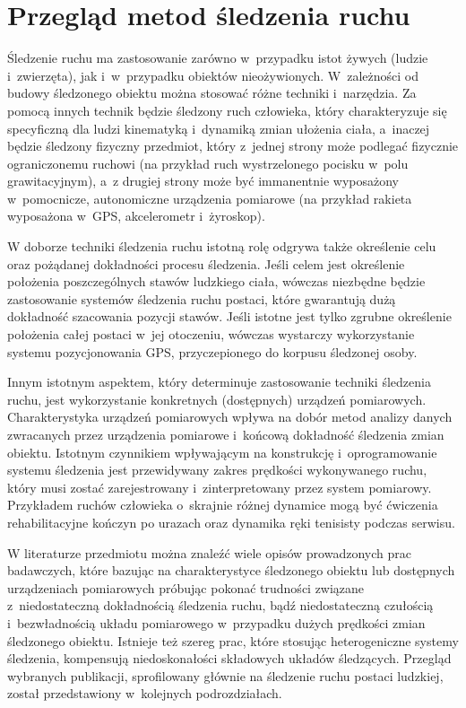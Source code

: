 \chapter{Przegląd metod śledzenia ruchu}\label{chap:literature}

Śledzenie ruchu ma zastosowanie zarówno w~przypadku istot żywych (ludzie i~zwierzęta), jak i~w~przypadku obiektów nieożywionych. W~zależności od budowy śledzonego obiektu można stosować różne techniki i~narzędzia. Za pomocą innych technik będzie śledzony ruch człowieka, który charakteryzuje się specyficzną dla ludzi kinematyką i~dynamiką zmian ułożenia ciała, a~inaczej będzie śledzony fizyczny przedmiot, który z~jednej strony może podlegać fizycznie ograniczonemu ruchowi (na przykład ruch wystrzelonego pocisku w~polu grawitacyjnym), a~z drugiej strony może być immanentnie wyposażony w~pomocnicze, autonomiczne urządzenia pomiarowe (na przykład rakieta wyposażona w~GPS, akcelerometr i~żyroskop). 

W doborze techniki śledzenia ruchu istotną rolę odgrywa także określenie celu oraz pożądanej dokładności procesu śledzenia. Jeśli celem jest określenie położenia poszczególnych stawów ludzkiego ciała, wówczas niezbędne będzie zastosowanie systemów śledzenia ruchu postaci, które gwarantują dużą dokładność szacowania pozycji stawów. Jeśli istotne jest tylko zgrubne określenie położenia całej postaci w~jej otoczeniu, wówczas wystarczy wykorzystanie systemu pozycjonowania GPS, przyczepionego do korpusu śledzonej osoby.

Innym istotnym aspektem, który determinuje zastosowanie techniki śledzenia ruchu, jest wykorzystanie konkretnych (dostępnych) urządzeń pomiarowych. Charakterystyka urządzeń pomiarowych wpływa na dobór metod analizy danych zwracanych przez urządzenia pomiarowe i~końcową dokładność śledzenia zmian obiektu. Istotnym czynnikiem wpływającym na konstrukcję i~oprogramowanie systemu śledzenia jest przewidywany zakres prędkości wykonywanego ruchu, który musi zostać zarejestrowany i~zinterpretowany przez system pomiarowy. Przykładem ruchów człowieka o~skrajnie różnej dynamice  mogą być ćwiczenia rehabilitacyjne kończyn po urazach oraz dynamika ręki tenisisty podczas serwisu.  

W literaturze przedmiotu można znaleźć wiele opisów prowadzonych prac badawczych, które bazując na charakterystyce śledzonego obiektu lub dostępnych urządzeniach pomiarowych próbując pokonać trudności związane z~niedostateczną dokładnością śledzenia ruchu, bądź niedostateczną czułością i~bezwładnością układu pomiarowego w~przypadku dużych prędkości zmian śledzonego obiektu. Istnieje też szereg prac, które stosując heterogeniczne systemy śledzenia, kompensują niedoskonałości składowych układów śledzących. 
Przegląd wybranych publikacji, sprofilowany głównie na śledzenie ruchu postaci ludzkiej, został przedstawiony w~kolejnych podrozdziałach.

